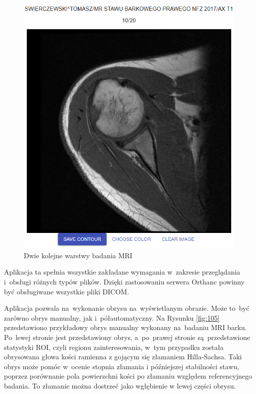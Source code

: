 \documentclass[a4paper,11pt,twoside,openright]{report}
\theoremstyle{definition}
\begin{document}
\begin{figure}[h!]
\begin{center}
\begin{center}
		\includegraphics[width=1.0\textwidth]{140}
	\end{center}
	\endminipage\hfill
	\caption{Dwie kolejne warstwy badania MRI}
	\label{fig:140}
\end{center}
\end{figure}


Aplikacja ta spełnia wszystkie zakładane wymagania w~zakresie przeglądania i~obsługi różnych typów plików.
Dzięki zastosowaniu serwera Orthanc powinny być obsługiwane wszystkie pliki DICOM.

Aplikacja pozwala na~wykonanie obrysu na~wyświetlanym obrazie. Może to~być zarówno obrys
manualny, jak i~półautomatyczny. Na Rysunku \ref{fig:105} przedstawiono przykładowy obrys manualny
wykonany na~badaniu MRI barku. Po~lewej stronie jest przedstawiony obrys, a~po~prawej 
stronie są~przedstawione statystyki ROI, czyli regionu zainteresowania, w~tym przypadku 
została obrysowana głowa kości ramienna z gojącym się złamaniem Hilla-Sachsa. Taki obrys może pomóc w~ocenie
stopnia złamania i późniejszej stabilności stawu, poprzez porównanie pola powierzchni kości po złamaniu
względem referencyjnego badania. To złamanie można dostrzeć jako wgłębienie w lewej części obrysu. 
\end{document}
